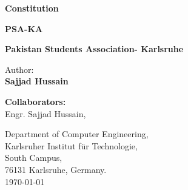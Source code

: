 \begin{titlepage}
\thispagestyle{empty}

\begin{center}
\hbox{}
\vfill

{\usesf\large
{\huge\bfseries Constitution}
\vskip 2.5cm

{\LARGE\bfseries PSA-KA}
\vskip 0.25cm

{\large\bfseries Pakistan Students Association- Karlsruhe\\}

\vskip 1.5cm

Author:  \\
{\large\bfseries Sajjad Hussain\\}

}
\end{center}
\vskip 3cm

\textbf{Collaborators:}  \\
{Engr. Sajjad Hussain,  \\}

\vskip 2cm
Department of Computer Engineering,\\
Karlsruher Institut für Technologie,\\
South Campus, \\
76131 Karlsruhe, Germany. \\

\vskip 1cm
\rightline\today

\vfill
\end{titlepage}

